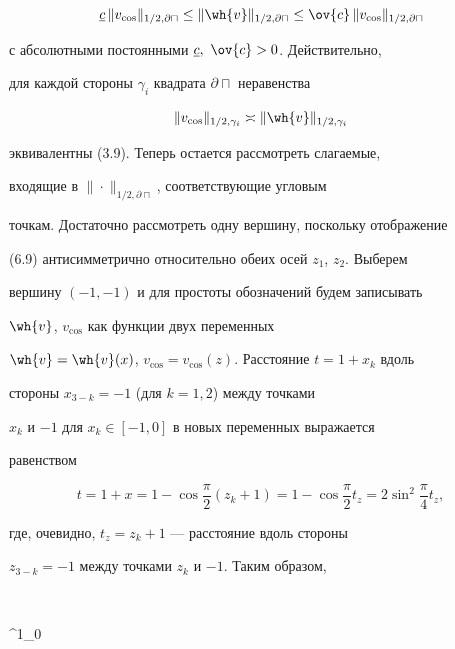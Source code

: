 \begin{equation}\label{eq6.10}


\underline{c}\, \|v_{\cos}\|_{1/2,\partial\sqcap} \leq


\|\wh{v}\|_{1/2,\partial\sqcap} \leq


\ov{c}\, \|v_{\cos}\|_{1/2,\partial\sqcap}


\end{equation}


с абсолютными постоянными $\underline{c},\ \ov{c} > 0$. Действительно, 


для каждой стороны $\gamma_i$ квадрата $\partial\sqcap$ неравенства


\begin{equation}\label{eq6.11}


\|v_{\cos}\|_{1/2,\gamma_i} \asymp \|\wh{v}\|_{1/2,\gamma_i}


\end{equation}


эквивалентны (3.9). Теперь остается рассмотреть слагаемые, 


входящие в $\|\cdot\|_{1/2,\partial\sqcap}$, соответствующие угловым 


точкам. Достаточно рассмотреть одну вершину, поскольку отображение 


(6.9) антисимметрично относительно обеих осей $z_1$, $z_2$. Выберем 


вершину $(-1,-1)$ и для простоты обозначений будем записывать 


$\wh{v}$, $v_{\cos}$ как функции двух переменных 


$\wh{v} = \wh{v}(x)$, $v_{\cos}=v_{\cos}(z)$. Расстояние $t=1+x_k$ вдоль 


стороны $x_{3-k} = -1$ (для $k=1,2$) между точками 


$x_k$ и $-1$ для $x_k \in [-1,0]$ в новых переменных выражается 


равенством


$$


t=1+x = 1 - \cos \frac{\pi}{2}(z_k + 1) = 1 -\cos\frac{\pi}{2} t_z =


2 \sin^2\frac{\pi}{4} t_z,


$$


где, очевидно, $t_z=z_k+1$ --- расстояние вдоль стороны 


$z_{3-k} = -1$ между точками $z_k$ и $-1$. Таким образом, 


$$


\int^1_0 


